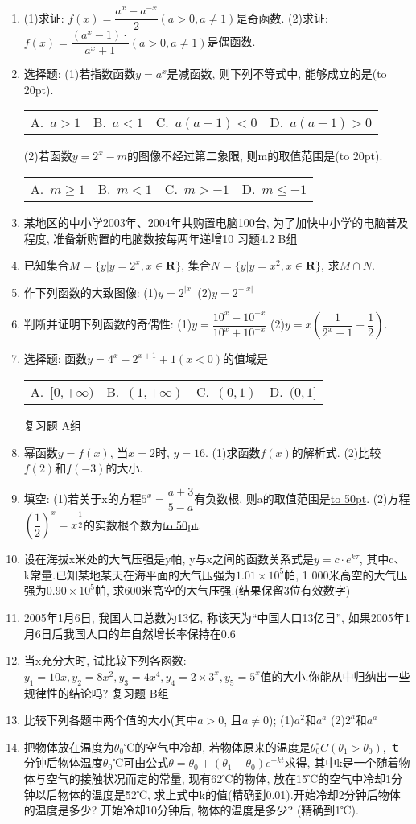 \documentclass[10pt,a4paper]{article}
\newcommand{\blank}[1]{\underline{\hbox to #1pt{}}}
\newcommand{\bracket}[1]{(\hbox to #1pt{})}
\newcommand{\fourch}[4]{\par\begin{tabular}{p{.23\textwidth}p{.23\textwidth}p{.23\textwidth}p{.23\textwidth}}
A.~#1 &B.~#2& C.~#3& D.~#4
\end{tabular}}
\begin{document}
\begin{enumerate}[1.]
\item (1)求证: $f(x)=\dfrac{a^x-a^{-x}}2(a>0,a\ne 1)$是奇函数.
(2)求证: $f(x)=\dfrac{({a^x}-1)\cdot }{{a^x}+1}(a>0,a\ne 1)$是偶函数.
\item 选择题:
(1)若指数函数$y=a^x$是减函数, 则下列不等式中, 能够成立的是\bracket{20}.
\fourch{$a>1$}{$a<1$}{$a(a-1)<0$}{$a(a-1)>0$}
(2)若函数$y=2^x-m$的图像不经过第二象限, 则m的取值范围是\bracket{20}.
\fourch{$m\ge 1$}{$m<1$}{$m>-1$}{$m\le -1$}
\item 某地区的中小学2003年、2004年共购置电脑100台, 为了加快中小学的电脑普及程度, 准备新购置的电脑数按每两年递增10%
习题4.2  B组
\item 已知集合$M=\{y|y=2^x,x\in \mathbf{R}\}$, 集合$N=\{y|y=x^2,x\in \mathbf{R}\}$, 求$M\cap N$.
\item 作下列函数的大致图像:
(1)$y=2^{|x|}$							(2)$y=2^{-|x|}$
\item 判断并证明下列函数的奇偶性:
(1)$y=\dfrac{{{10}^x}-{{10}^{-x}}}{{{10}^x}+{{10}^{-x}}}$					(2)$y=x(\dfrac 1{2^x-1}+\dfrac 12)$.
\item 选择题:
函数$y=4^x-2^{x+1}+1(x<0)$的值域是
\fourch{$[0,+\infty)$}{$(1,+\infty)$}{$(0,1)$}{$(0,1]$}
复习题
A组
\item 幂函数$y=f(x)$, 当$x=2$时, $y=16$.
(1)求函数$f(x)$的解析式.
(2)比较$f(2)$和$f(-3)$的大小.
\item 填空:
(1)若关于x的方程$5^x=\dfrac{a+3}{5-a}$有负数根, 则a的取值范围是\blank{50}.
(2)方程$(\dfrac 12)^x=x^{\dfrac 12}$的实数根个数为\blank{50}.
\item 设在海拔x米处的大气压强是y帕, y与x之间的函数关系式是$y=c\cdot e^{k\tau }$, 其中c、k常量.已知某地某天在海平面的大气压强为$1.01\times 10^5$帕, 1 000米高空的大气压强为$0.90\times 10^5$帕, 求600米高空的大气压强.(结果保留3位有效数字)
\item 2005年1月6日, 我国人口总数为13亿, 称该天为``中国人口13亿日'', 如果2005年1月6日后我国人口的年自然增长率保持在0.6%
\item 当x充分大时, 试比较下列各函数: $y_1=10x,y_2=8x^2,y_3=4x^4,y_4=2\times 3^x,y_5=5^x$值的大小.你能从中归纳出一些规律性的结论吗?
复习题
B组
\item 比较下列各题中两个值的大小(其中$a>0$, 且$a\ne 0$);
(1)$a^2$和$a^a$							(2)$2^a$和$a^a$
\item 把物体放在温度为$\theta _0$℃的空气中冷却, 若物体原来的温度是$\theta _0^\circ C(\theta _1>\theta _0)$, ｔ分钟后物体温度$\theta _0$℃可由公式$\theta =\theta _0+(\theta _1-\theta _0)e^{-kt}$求得, 其中k是一个随着物体与空气的接触状况而定的常量, 现有62℃的物体, 放在15℃的空气中冷却1分钟以后物体的温度是52℃, 求上式中k的值(精确到0.01).开始冷却2分钟后物体的温度是多少? 开始冷却10分钟后, 物体的温度是多少? (精确到1℃).

\end{enumerate}
\end{document}
